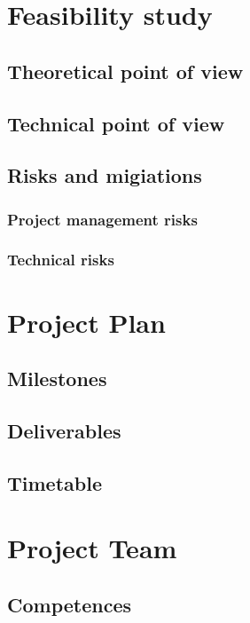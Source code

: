 \documentclass[notitlepage]{article}
\begin{document}
\begin{flushleft}
\section{Feasibility study}

\subsection{Theoretical point of view}

\subsection{Technical point of view}

\subsection{Risks and migiations}

\subsubsection{Project management risks}

\subsubsection{Technical risks}

\section{Project Plan}

\subsection{Milestones}

\subsection{Deliverables}

\subsection{Timetable}

\section{Project Team}

\subsection{Competences} 

\end{flushleft}
\end{document}
